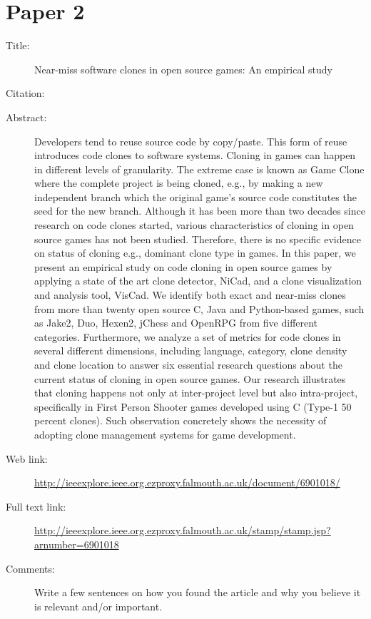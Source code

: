 \documentclass{scrartcl}
\begin{document}
\section*{Paper 2}
\begin{description}
\item[Title:] Near-miss software clones in open source games: An empirical study
\item[Citation:] \cite{NearMiss}
\item[Abstract:] Developers tend to reuse source code by copy/paste. This form of reuse introduces code clones to software systems. Cloning in games can happen in different levels of granularity. The extreme case is known as Game Clone where the complete project is being cloned, e.g., by making a new independent branch which the original game's source code constitutes the seed for the new branch. Although it has been more than two decades since research on code clones started, various characteristics of cloning in open source games has not been studied. Therefore, there is no specific evidence on status of cloning e.g., dominant clone type in games. In this paper, we present an empirical study on code cloning in open source games by applying a state of the art clone detector, NiCad, and a clone visualization and analysis tool, VisCad. We identify both exact and near-miss clones from more than twenty open source C, Java and Python-based games, such as Jake2, Duo, Hexen2, jChess and OpenRPG from five different categories. Furthermore, we analyze a set of metrics for code clones in several different dimensions, including language, category, clone density and clone location to answer six essential research questions about the current status of cloning in open source games. Our research illustrates that cloning happens not only at inter-project level but also intra-project, specifically in First Person Shooter games developed using C (Type-1 50 percent clones). Such observation concretely shows the necessity of adopting clone management systems for game development.
\item[Web link:] \url{http://ieeexplore.ieee.org.ezproxy.falmouth.ac.uk/document/6901018/}
\item[Full text link:] \url{http://ieeexplore.ieee.org.ezproxy.falmouth.ac.uk/stamp/stamp.jsp?arnumber=6901018}
\item[Comments:] Write a few sentences on how you found the article and why you believe it is relevant and/or important.
\end{description}
\end{document}

